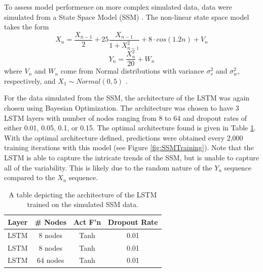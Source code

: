 To assess model performence on more complex simulated data, data were simulated from a State Space Model (SSM) \citep{kitagawa1996monte}. The non-linear state space model takes the form
$$ X_n = \frac{X_{n-1}}{2} + 25\frac{X_{n-1}}{1+X_{n-1}^2} + 8\cdot cos(1.2n) + V_n$$
$$Y_n = \frac{X_n^2}{20} + W_n$$
where $V_n$ and $W_n$ come from Normal distributions with variance $\sigma^2_v$ and $\sigma^2_w$, respectively, and $X_1 \sim Normal(0,5)$ \citep{andrieu2010particle}.

For the data simulated from the SSM, the architecture of the LSTM was again chosen using Bayesian Optimization. The architecture was chosen to have 3 LSTM layers with number of nodes ranging from 8 to 64 and dropout rates of either 0.01, 0.05, 0.1, or 0.15. The optimal architecture found is given in Table \ref{tab:SSMArchitecture}. With the optimal architecture defined, predictions were obtained every 2,000 training iterations with this model (see Figure \ref{fig:SSMTraining}). Note that the LSTM is able to capture the intricate trends of the SSM, but is unable to capture all of the variability. This is likely due to the random nature of the $Y_n$ sequence compared to the $X_n$ sequence.

\begin{table}[hbt!]
\centering
\begin{tabular}{|c|c|c|c|}
    \hline 
    Layer & \# Nodes & Act F'n & Dropout Rate \\
    \hline
    LSTM & 8 nodes & Tanh  & 0.01  \\
    \hline
    LSTM & 8 nodes & Tanh & 0.01 \\
    \hline
    LSTM & 64 nodes & Tanh & 0.01 \\
    \hline
\end{tabular}
\caption{A table depicting the architecture of the LSTM trained on the simulated SSM data.}
\label{tab:SSMArchitecture}
\end{table}

